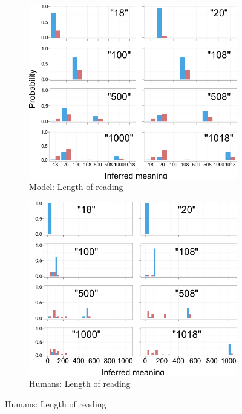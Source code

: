 \documentclass{article} %
\begin{document}
\begin{figure}[t]
        \qquad
        
       
       \begin{subfigure}[b]{0.51\textwidth}
                \centering
                \caption{Model: Length of reading}
                \includegraphics[width=\textwidth]{model_reading_all.png}
	\end{subfigure}
        \begin{subfigure}[b]{0.51\textwidth}
                \centering       
                \caption{Humans: Length of reading}         
                \includegraphics[width=\textwidth]{humans_reading_all.png}

\end{subfigure}
\end{figure}
\end{document}

